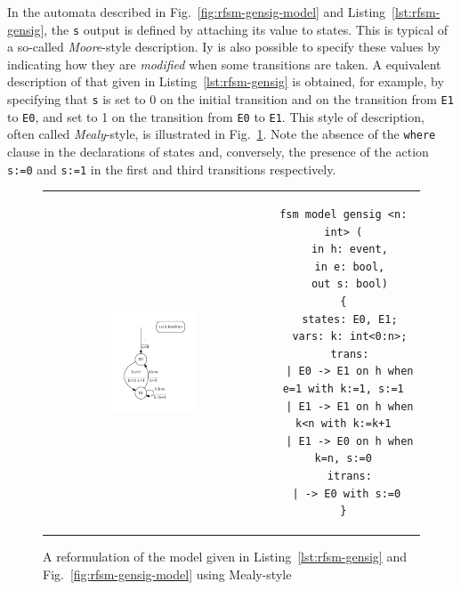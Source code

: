 In the automata described in Fig.~\ref{fig:rfsm-gensig-model} and Listing~\ref{lst:rfsm-gensig}, the
\texttt{s} output is defined by attaching its value to states.
This is typical of a so-called \emph{Moore}-style description.
Iy is also possible to specify these values by indicating how they are \emph{modified} when some
transitions are taken. A equivalent description of that given in Listing~\ref{lst:rfsm-gensig} is
obtained, for example, by specifying that
\texttt{s} is set to 0 on the initial transition and on the transition from \texttt{E1} to
\texttt{E0}, and set to 1 on the transition from \texttt{E0} to \texttt{E1}. 
This style of description, often called \emph{Mealy}-style, is illustrated in
Fig.~\ref{fig:rfsm-gensig-mealy}. Note the absence of the \texttt{where} clause in the
declarations of states and, conversely, the presence of the action
\lstinline[language=Rfsm]{s:=0} and \lstinline[language=Rfsm]{s:=1} in the first and third
transitions respectively.

\begin{figure}[htbp]
  \centering
  \begin{tabular}[c]{cc}
\includegraphics[width=0.4\textwidth]{figs/gensig-model-mealy} &
\begin{minipage}[b]{0.6\textwidth}
\begin{lstlisting}[language=Rfsm]
fsm model gensig <n: int> (
  in h: event,
  in e: bool,
  out s: bool)
{
  states: E0, E1;
  vars: k: int<0:n>;
  trans:
  | E0 -> E1 on h when e=1 with k:=1, s:=1
  | E1 -> E1 on h when k<n with k:=k+1
  | E1 -> E0 on h when k=n, s:=0
  itrans:
 | -> E0 with s:=0
}
\end{lstlisting}
\end{minipage}
  \end{tabular}
  \caption{A reformulation of the model given in Listing~\ref{lst:rfsm-gensig} and
    Fig.~\ref{fig:rfsm-gensig-model} using Mealy-style}
  \label{fig:rfsm-gensig-mealy}
\end{figure}

